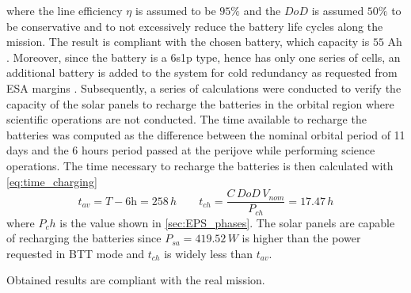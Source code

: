 where the line efficiency $\eta$ is assumed to be $95\%$ and the $DoD$ is assumed $50\%$ to be conservative and to not excessively reduce the battery life cycles along the mission. The result is compliant with the chosen battery, which capacity is $55$ Ah 
\mref.
Moreover, since the battery is a 6s1p type, hence has only one series of cells, an additional battery is added to the system for cold redundancy as requested from ESA margins 
\mref. 
Subsequently, a series of calculations were conducted to verify the capacity of the solar panels to recharge the batteries in the orbital region where scientific operations are not conducted. The time available to recharge the batteries was computed as the difference between the nominal orbital period of 11 days and the 6 hours period passed at the perijove while performing science operations. The time necessary to recharge the batteries is then calculated with \autoref{eq:time_charging}
\begin{equation}
    \label{eq:time_charging}
    t_{av} = T - 6 \textrm{h} = 258 \, h \qquad
    t_{ch}=\frac{C \, DoD \, V_{nom}}{P_{ch}}=17.47 \,h
\end{equation}
where $P_ch$ is the value shown in \autoref{sec:EPS_phases}. The solar panels are capable of recharging the batteries since $P_{sa}=419.52 \, W$ is higher than the power requested in BTT mode 
\mref 
and $t_{ch}$ is widely less than $t_{av}$. 

Obtained results are compliant with the real mission.  



